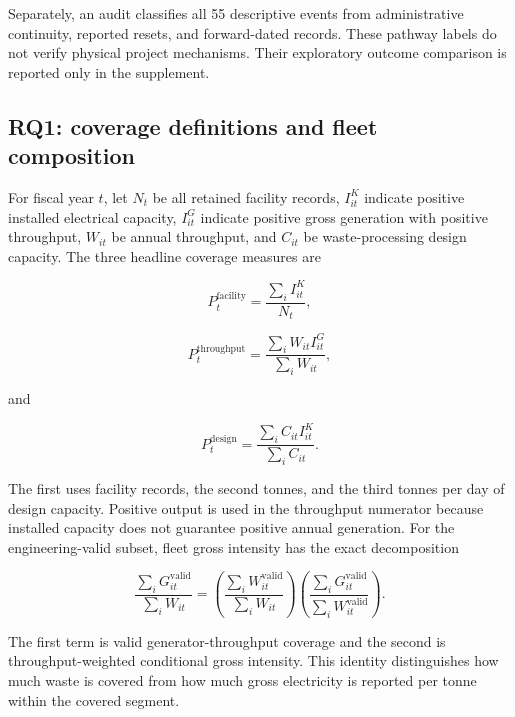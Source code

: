 \documentclass[11pt,letterpaper]{article}
\begin{document}
Separately, an audit classifies all 55 descriptive events from administrative
continuity, reported resets, and forward-dated records. These pathway labels do
not verify physical project mechanisms. Their exploratory outcome comparison is
reported only in the supplement.

\subsection{RQ1: coverage definitions and fleet composition}

For fiscal year $t$, let $N_t$ be all retained facility records,
$I_{it}^{K}$ indicate positive installed electrical capacity, $I_{it}^{G}$
indicate positive gross generation with positive throughput, $W_{it}$ be
annual throughput, and $C_{it}$ be waste-processing design capacity. The three
headline coverage measures are

\begin{equation}
P_t^{\mathrm{facility}}=\frac{\sum_i I_{it}^{K}}{N_t},
\label{eq:facility-coverage}
\end{equation}

\begin{equation}
P_t^{\mathrm{throughput}}=
\frac{\sum_i W_{it}I_{it}^{G}}{\sum_i W_{it}},
\label{eq:throughput-coverage}
\end{equation}

and

\begin{equation}
P_t^{\mathrm{design}}=
\frac{\sum_i C_{it}I_{it}^{K}}{\sum_i C_{it}}.
\label{eq:design-coverage}
\end{equation}

The first uses facility records, the second tonnes, and the third tonnes per day
of design capacity. Positive output is used in the throughput numerator because
installed capacity does not guarantee positive annual generation. For the
engineering-valid subset, fleet gross intensity has the exact decomposition

\begin{equation}
\frac{\sum_i G_{it}^{\mathrm{valid}}}{\sum_i W_{it}}
=
\left(\frac{\sum_i W_{it}^{\mathrm{valid}}}{\sum_i W_{it}}\right)
\left(\frac{\sum_i G_{it}^{\mathrm{valid}}}
{\sum_i W_{it}^{\mathrm{valid}}}\right).
\label{eq:fleet-decomposition}
\end{equation}

The first term is valid generator-throughput coverage and the second is
throughput-weighted conditional gross intensity. This identity distinguishes
how much waste is covered from how much gross electricity is reported per tonne
within the covered segment.
\end{document}
